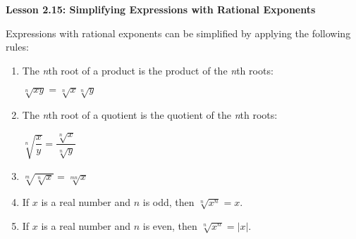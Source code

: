 \begin{center}
\textbf{Lesson 2.15: Simplifying Expressions with Rational Exponents}
\end{center}

\vspace*{1ex}

Expressions with rational exponents can be simplified by applying the following rules:
\begin{enumerate}[noitemsep, label = \color{blue}\arabic*. ]
\item The \emph{n}th root of a product is the product of the \emph{n}th roots:

  {\centering $ \sqrt[{\scriptstyle n}]{xy} = \sqrt[{\scriptstyle n}]{x}\sqrt[{\scriptstyle n}]{y} $ \par}
\item The \emph{n}th root of a quotient is the quotient of the \emph{n}th roots:

  {\centering $ \sqrt[{\scriptstyle n}]{\dfrac{x}{y}} = \dfrac{\sqrt[{\scriptstyle n}]{x}}{\sqrt[{\scriptstyle n}]{y}} $ \par}
    \item  $ \sqrt[{\scriptstyle m}]{\sqrt[{\scriptstyle n}]{x}} = \sqrt[{\scriptstyle mn}]{x}$
    \item If $x$ is a real number and $n$ is odd, then $ \sqrt[{\scriptstyle n}]{x^{n}} = x $.
    \item If $x$ is a real number and $n$ is even, then $ \sqrt[{\scriptstyle n}]{x^{n}} = |x| $.
\end{enumerate}





